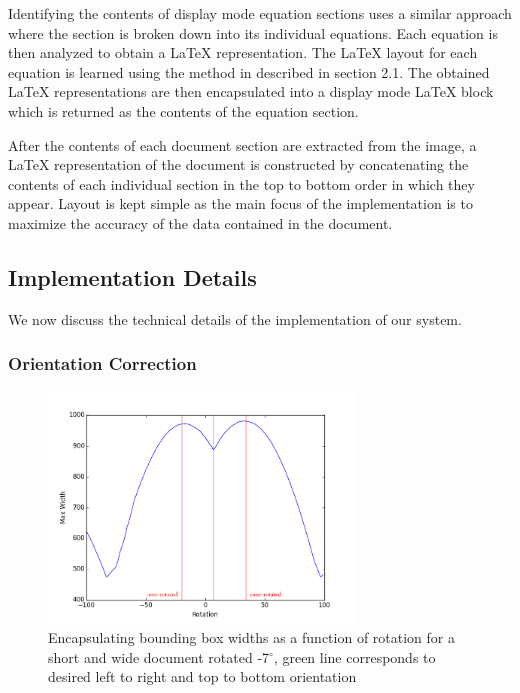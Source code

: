 \documentclass[12pt]{IEEEtran}
\newcommand{\latex}{\LaTeX\xspace}
\begin{document}
Identifying the contents of display mode equation sections uses a similar approach where the section is broken down  into its individual equations. Each equation is then analyzed to obtain a \latex representation. The \latex layout for each equation is learned using the method in \cite{4} described in section 2.1. The obtained \latex representations are then encapsulated into a display mode \latex block which is returned as the contents of the equation section.

After the contents of each document section are extracted from the image, a \latex representation of the document is constructed by concatenating the contents of each individual section in the top to bottom order in which they appear. Layout is kept simple as the main focus of the implementation is to maximize the accuracy of the data contained in the document.

\subsection{Implementation Details}

We now discuss the technical details of the implementation of our system.

\subsubsection{Orientation Correction}

\begin{figure}[h]
  \centering
    \includegraphics[width=3.2in]{rotationPlot.png}
  \caption{Encapsulating bounding box widths as a function of rotation for a short and wide document rotated -7$^\circ$, green line corresponds to desired left to right and top to bottom orientation}
  \label{fig:rotations}
\end{figure}
\end{document}

